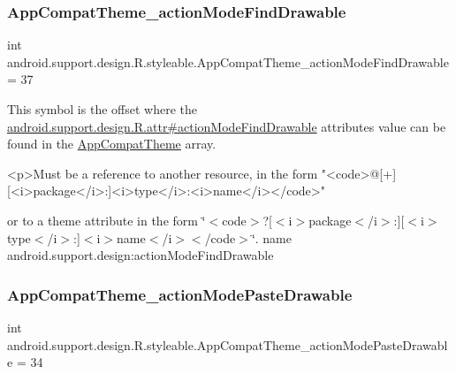 \subsubsection{\texorpdfstring{App\+Compat\+Theme\+\_\+action\+Mode\+Find\+Drawable}{AppCompatTheme\_actionModeFindDrawable}}
{\footnotesize\ttfamily int android.\+support.\+design.\+R.\+styleable.\+App\+Compat\+Theme\+\_\+action\+Mode\+Find\+Drawable = 37\hspace{0.3cm}{\ttfamily [static]}}

This symbol is the offset where the \hyperlink{classandroid_1_1support_1_1design_1_1R_1_1attr_a6c300bed753442a0bfe70d18f1540cfc}{android.\+support.\+design.\+R.\+attr\#action\+Mode\+Find\+Drawable} attribute\textquotesingle{}s value can be found in the \hyperlink{classandroid_1_1support_1_1design_1_1R_1_1styleable_afb351dc8de20cbd4c89abe360373010c}{App\+Compat\+Theme} array.

\begin{DoxyVerb}      <p>Must be a reference to another resource, in the form "<code>@[+][<i>package</i>:]<i>type</i>:<i>name</i></code>"
\end{DoxyVerb}
 or to a theme attribute in the form \char`\"{}$<$code$>$?\mbox{[}$<$i$>$package$<$/i$>$\+:\mbox{]}\mbox{[}$<$i$>$type$<$/i$>$\+:\mbox{]}$<$i$>$name$<$/i$>$$<$/code$>$\char`\"{}.  name android.\+support.\+design\+:action\+Mode\+Find\+Drawable \mbox{\label{classandroid_1_1support_1_1design_1_1R_1_1styleable_af873cad74307d6ae72d31314ebb7eb9d}} 
\subsubsection{\texorpdfstring{App\+Compat\+Theme\+\_\+action\+Mode\+Paste\+Drawable}{AppCompatTheme\_actionModePasteDrawable}}
{\footnotesize\ttfamily int android.\+support.\+design.\+R.\+styleable.\+App\+Compat\+Theme\+\_\+action\+Mode\+Paste\+Drawable = 34\hspace{0.3cm}{\ttfamily [static]}}

